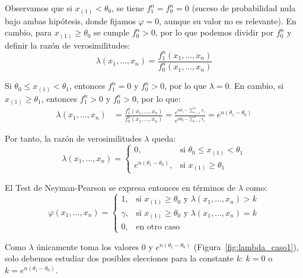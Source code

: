 \begin{ejercicio}
\begin{description}
    Observamos que si $x_{(1)} < \theta_0$, se tiene $f_1^n = f_0^n = 0$ (suceso de probabilidad nula bajo ambas hipótesis, donde fijamos $\varphi = 0$, aunque su valor no es relevante). En cambio, para $x_{(1)} \ge \theta_0$ se cumple $f_0^n > 0$, por lo que podemos dividir por $f_0^n$ y definir la razón de verosimilitudes:
    \begin{equation*}
        \lambda(x_1, \dots, x_n) = \frac{f_1^n(x_1, \dots, x_n)}{f_0^n(x_1, \dots, x_n)}
    \end{equation*}

    Si $\theta_0 \le x_{(1)} < \theta_1$, entonces $f_1^n = 0$ y $f_0^n > 0$, por lo que $\lambda = 0$. En cambio, si $x_{(1)} \ge \theta_1$, entonces $f_1^n > 0$ y $f_0^n > 0$, por lo que:
    \begin{align*}
        \lambda(x_1, \dots, x_n) &= \frac{f_1^n(x_1, \dots, x_n)}{f_0^n(x_1, \dots, x_n)} = \frac{e^{n\theta_1 - \sum\limits_{i=1}^{n} x_i}}{e^{n\theta_0 - \sum\limits_{i=1}^{n} x_i}} = e^{n(\theta_1 - \theta_0)}
    \end{align*}

    Por tanto, la razón de verosimilitudes $\lambda$ queda:
    \begin{equation*}
        \lambda(x_1, \dots, x_n) =
        \begin{cases}
            0, & \text{si } \theta_0 \le x_{(1)} < \theta_1 \\
            e^{n(\theta_1 - \theta_0)}, & \text{si } x_{(1)} \ge \theta_1
        \end{cases}
    \end{equation*}


    El Test de Neyman-Pearson se expresa entonces en términos de $\lambda$ como:
    \begin{equation*}
        \varphi(x_1, \dots, x_n) =
        \begin{cases}
            1, & \text{si } x_{(1)} \ge \theta_0 \text{ y } \lambda(x_1, \dots, x_n) > k \\
            \gamma, & \text{si } x_{(1)} \ge \theta_0 \text{ y } \lambda(x_1, \dots, x_n) = k \\
            0, & \text{en otro caso}
        \end{cases}
    \end{equation*}

    Como $\lambda$ únicamente toma los valores $0$ y $e^{n(\theta_1 - \theta_0)}$ (Figura~\ref{fig:lambda_caso1}), solo debemos estudiar dos posibles elecciones para la constante $k$: $k = 0$ o $k = e^{n(\theta_1 - \theta_0)}$.


\end{description}
\end{ejercicio}

